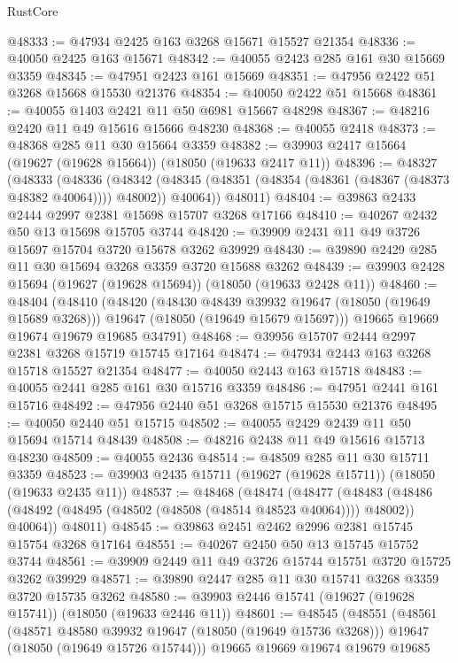 \begin{lexlean}{RustCore}
\begin{coremodule}
@48333 := @47934 @2425 @163 @3268 @15671 @15527 @21354
@48336 := @40050 @2425 @163 @15671
@48342 := @40055 @2423 @285 @161 @30 @15669 @3359
@48345 := @47951 @2423 @161 @15669
@48351 := @47956 @2422 @51 @3268 @15668 @15530 @21376
@48354 := @40050 @2422 @51 @15668
@48361 := @40055 @1403 @2421 @11 @50 @6981 @15667 @48298
@48367 := @48216 @2420 @11 @49 @15616 @15666 @48230
@48368 := @40055 @2418
@48373 := @48368 @285 @11 @30 @15664 @3359
@48382 := @39903 @2417 @15664 (@19627 (@19628 @15664)) (@18050 (@19633 @2417 @11))
@48396 := @48327
    (@48333
      (@48336
        (@48342 (@48345 (@48351 (@48354 (@48361 (@48367 (@48373 @48382 @40064)))) @48002)) @40064))
      @48011)
@48404 := @39863 @2433 @2444 @2997 @2381 @15698 @15707 @3268 @17166
@48410 := @40267 @2432 @50 @13 @15698 @15705 @3744
@48420 := @39909 @2431 @11 @49 @3726 @15697 @15704 @3720 @15678 @3262 @39929
@48430 := @39890 @2429 @285 @11 @30 @15694 @3268 @3359 @3720 @15688 @3262
@48439 := @39903 @2428 @15694 (@19627 (@19628 @15694)) (@18050 (@19633 @2428 @11))
@48460 := @48404
    (@48410
      (@48420
        (@48430 @48439 @39932 @19647 (@18050 (@19649 @15689 @3268)))
        @19647
        (@18050 (@19649 @15679 @15697)))
      @19665
      @19669
      @19674
      @19679
      @19685
      @34791)
@48468 := @39956 @15707 @2444 @2997 @2381 @3268 @15719 @15745 @17164
@48474 := @47934 @2443 @163 @3268 @15718 @15527 @21354
@48477 := @40050 @2443 @163 @15718
@48483 := @40055 @2441 @285 @161 @30 @15716 @3359
@48486 := @47951 @2441 @161 @15716
@48492 := @47956 @2440 @51 @3268 @15715 @15530 @21376
@48495 := @40050 @2440 @51 @15715
@48502 := @40055 @2429 @2439 @11 @50 @15694 @15714 @48439
@48508 := @48216 @2438 @11 @49 @15616 @15713 @48230
@48509 := @40055 @2436
@48514 := @48509 @285 @11 @30 @15711 @3359
@48523 := @39903 @2435 @15711 (@19627 (@19628 @15711)) (@18050 (@19633 @2435 @11))
@48537 := @48468
    (@48474
      (@48477
        (@48483 (@48486 (@48492 (@48495 (@48502 (@48508 (@48514 @48523 @40064)))) @48002)) @40064))
      @48011)
@48545 := @39863 @2451 @2462 @2996 @2381 @15745 @15754 @3268 @17164
@48551 := @40267 @2450 @50 @13 @15745 @15752 @3744
@48561 := @39909 @2449 @11 @49 @3726 @15744 @15751 @3720 @15725 @3262 @39929
@48571 := @39890 @2447 @285 @11 @30 @15741 @3268 @3359 @3720 @15735 @3262
@48580 := @39903 @2446 @15741 (@19627 (@19628 @15741)) (@18050 (@19633 @2446 @11))
@48601 := @48545
    (@48551
      (@48561
        (@48571 @48580 @39932 @19647 (@18050 (@19649 @15736 @3268)))
        @19647
        (@18050 (@19649 @15726 @15744)))
      @19665
      @19669
      @19674
      @19679
      @19685

\end{coremodule}
\end{lexlean}
